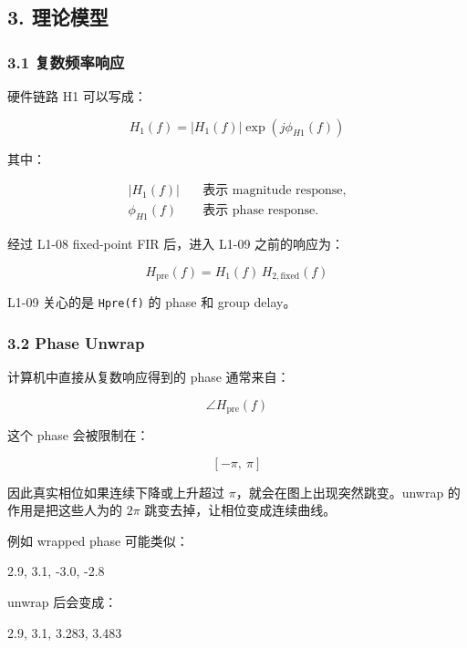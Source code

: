 \documentclass[
]{ctexart}
\newenvironment{Shaded}{}{}
\newcommand{\NormalTok}[1]{#1}
\begin{document}
\subsection{3. 理论模型}\label{ux7406ux8bbaux6a21ux578b}

\subsubsection{3.1
复数频率响应}\label{ux590dux6570ux9891ux7387ux54cdux5e94}

硬件链路 H1 可以写成：

\[
H_1(f)=\left|H_1(f)\right|\exp\!\left(j\phi_{H1}(f)\right)
\]

其中：

\[
\begin{aligned}
\left|H_1(f)\right| &\quad \text{表示 magnitude response},\\
\phi_{H1}(f) &\quad \text{表示 phase response}.
\end{aligned}
\]

经过 L1-08 fixed-point FIR 后，进入 L1-09 之前的响应为：

\[
H_{\mathrm{pre}}(f)=H_1(f)\,H_{2,\mathrm{fixed}}(f)
\]

L1-09 关心的是 \texttt{Hpre(f)} 的 phase 和 group delay。

\subsubsection{3.2 Phase Unwrap}\label{phase-unwrap}

计算机中直接从复数响应得到的 phase 通常来自：

\[
\angle H_{\mathrm{pre}}(f)
\]

这个 phase 会被限制在：

\[
[-\pi,\ \pi]
\]

因此真实相位如果连续下降或上升超过 \(\pi\)，就会在图上出现突然跳变。unwrap
的作用是把这些人为的 \(2\pi\) 跳变去掉，让相位变成连续曲线。

例如 wrapped phase 可能类似：

\begin{Shaded}
\begin{Highlighting}[]
\NormalTok{2.9, 3.1, {-}3.0, {-}2.8}
\end{Highlighting}
\end{Shaded}

unwrap 后会变成：

\begin{Shaded}
\begin{Highlighting}[]
\NormalTok{2.9, 3.1, 3.283, 3.483}
\end{Highlighting}
\end{Shaded}
\end{document}
